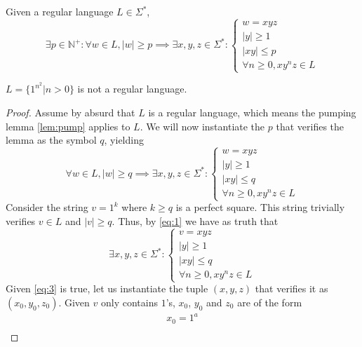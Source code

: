 \documentclass[docid=PA06]{tcom_PA}
\begin{document}
\setcounter{chapter}{5}
{

\begin{lemma} \label{lem:pump}
Given a regular language $L \in \Sigma^*$,
\begin{equation*}
	\exists p \in \mathbb{N}^+ \colon \forall w \in L, |w|\geq p \implies
	\exists x,y,z \in \Sigma^* \colon
	\begin{cases}
		w=xyz\\
		|y|\geq 1\\
		|xy|\leq p\\
		\forall n \geq 0, x y^n z \in L
	\end{cases}
\end{equation*}
\end{lemma}
\begin{theorem}
	$L=\{1^{n^2} | n>0\}$ is not a regular language.
\end{theorem}
\begin{proof}
Assume by absurd that $L$ is a regular language, which means the pumping lemma \eqref{lem:pump} applies to $L$. We will now instantiate the $p$ that verifies the lemma as the symbol $q$, yielding
	\begin{equation} \label{eq:1}
	\forall w \in L, |w|\geq q \implies
	\exists x,y,z \in \Sigma^* \colon
	\begin{cases}
		w=xyz\\
		|y|\geq 1\\
		|xy|\leq q\\
		\forall n \geq 0, x y^n z \in L
	\end{cases}
\end{equation}
Consider the string $v=1^k$ where $k\geq q$ is a perfect square. This string trivially verifies $v \in L$ and $|v|\geq q$. Thus, by \eqref{eq:1} we have as truth that
\begin{equation}\label{eq:3}
	\exists x,y,z \in \Sigma^* \colon
	\begin{cases}
		v=xyz\\
		|y|\geq 1\\
		|xy|\leq q\\
		\forall n \geq 0, x y^n z \in L
	\end{cases}
\end{equation}
Given \eqref{eq:3} is true, let us instantiate the tuple $(x,y,z)$ that verifies it as $(x_0,y_0,z_0)$. Given $v$ only contains $1$'s, $x_0$, $y_0$ and $z_0$ are of the form
\begin{gather*}
	x_0=1^a\\

\end{gather*}
\end{proof}}
\end{document}
